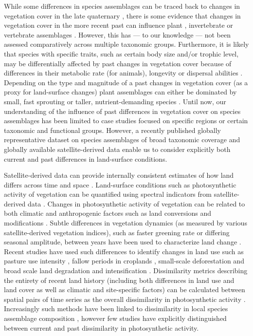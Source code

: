 While some differences in species assemblages can be traced back to changes in vegetation cover in the late quaternary \citep{Vegas-Vilarrubia2011,McMichael2017}, there is some evidence that changes in vegetation cover in the more recent past can influence plant \citep{Jakovac2016}, invertebrate \citep{Valtonen2013} or vertebrate assemblages \citep{Newton2014, Cole2015, Graham2015}. However, this has — to our knowledge — not been assessed comparatively across multiple taxonomic groups. Furthermore, it is likely that species with specific traits, such as certain body size and/or trophic level, may be differentially affected by past changes in vegetation cover because of differences in their metabolic rate (for animals), longevity or dispersal abilities \citep{Sutherland2000, Brown2004, Speakman2005,Thomson2011,DePalma2015}. Depending on the type and magnitude of a past changes in vegetation cover (as a proxy for land-surface changes) plant assemblages can either be dominated by small, fast sprouting or taller, nutrient-demanding species \citep{Jakovac2016,Perring2018}. Until now, our understanding of the influence of past differences in vegetation cover on species assemblages has been limited to case studies focused on specific regions or certain taxonomic and functional groups. However, a recently published globally representative dataset on species assemblages of broad taxonomic coverage \citep{Hudson2016} and globally available satellite-derived data enable us to consider explicitly both current and past differences in land-surface conditions.

Satellite-derived data can provide internally consistent estimates of how land differs across time and space \citep{Pettorelli2005, Kennedy2014}. Land-surface conditions such as photosynthetic activity of vegetation can be quantified using spectral indicators from satellite-derived data \citep{Gamon1995, Zhang2006}. Changes in photosynthetic activity of vegetation can be related to both climatic \citep{Fensholt2012, Zhu2016} and anthropogenic factors such as land conversions and modifications \citep{Lambin2003, Muller2014}. Subtle differences in vegetation dynamics (as measured by various satellite-derived vegetation indices), such as faster greening rate or differing seasonal amplitude, between years have been used to characterize land change \citep{Lambin1994, Linderman2005, Lupo2007}. Recent studies have used such differences to identify changes in land use such as pasture use intensity \citep{Rufin2015}, fallow periods in croplands \citep{Estel2015, Tong2017}, small-scale deforestation \citep{DeVries2015b} and broad scale land degradation and intensification \citep{dejong2011,Muller2014}. Dissimilarity metrics describing the entirety of recent land history (\eg including both differences in land use and land cover as well as climatic and site-specific factors) can be calculated between spatial pairs of time series as the overall dissimilarity in photosynthetic activity \citep{Linderman2005, Lhermitte2011}. Increasingly such methods have been linked to dissimilarity in local species assemblage composition \citep{Rowhani2008, Goetz2014, Nieto2015, Hobi2017}, however few studies have explicitly distinguished between current and past dissimilarity in photosynthetic activity.
	
